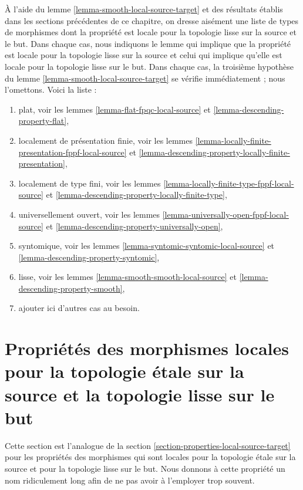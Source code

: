 \begin{remark}
\label{remark-list-local-source-target}
À l'aide du
lemme \ref{lemma-smooth-local-source-target}
et des résultats établis dans les sections précédentes de ce chapitre, on dresse aisément
une liste de types de morphismes dont la propriété est locale pour la topologie lisse sur la
source et le but. Dans chaque cas, nous indiquons le lemme qui implique que
la propriété est locale pour la topologie lisse sur la source et celui qui implique qu'elle
est locale pour la topologie lisse sur le but. Dans chaque cas, la troisième hypothèse
du
lemme \ref{lemma-smooth-local-source-target}
se vérifie immédiatement ; nous l'omettons. Voici la liste :
\begin{enumerate}
\item plat, voir les
lemmes \ref{lemma-flat-fpqc-local-source} et
\ref{lemma-descending-property-flat},
\item localement de présentation finie, voir les
lemmes \ref{lemma-locally-finite-presentation-fppf-local-source} et
\ref{lemma-descending-property-locally-finite-presentation},
\item localement de type fini, voir les
lemmes \ref{lemma-locally-finite-type-fppf-local-source} et
\ref{lemma-descending-property-locally-finite-type},
\item universellement ouvert, voir les
lemmes \ref{lemma-universally-open-fppf-local-source} et
\ref{lemma-descending-property-universally-open},
\item syntomique, voir les
lemmes \ref{lemma-syntomic-syntomic-local-source} et
\ref{lemma-descending-property-syntomic},
\item lisse, voir les
lemmes \ref{lemma-smooth-smooth-local-source} et
\ref{lemma-descending-property-smooth},
\item ajouter ici d'autres cas au besoin.
\end{enumerate}
\end{remark}






\section{Propriétés des morphismes locales pour la topologie \'etale sur la source et la topologie lisse sur le but}
\label{section-properties-etale-smooth-local-source-target}

\noindent
Cette section est l'analogue de la
section \ref{section-properties-local-source-target}
pour les propriétés des morphismes qui sont locales pour la topologie \'etale
sur la source et pour la topologie lisse sur le but.
Nous donnons à cette propriété un nom ridiculement long
afin de ne pas avoir à l'employer trop souvent.

